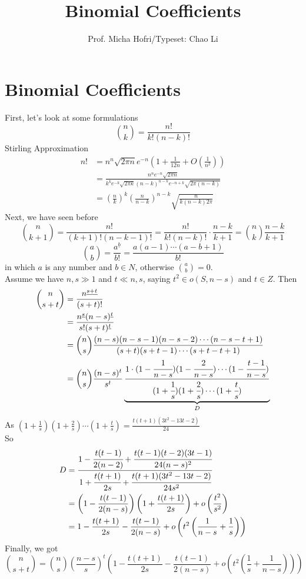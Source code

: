 \documentclass[11pt]{article}
\author{Prof. Micha Hofri/Typeset:  Chao Li}
\title{Binomial Coefficients}
\begin{document}
\maketitle
\section*{Binomial Coefficients}
First, let's look at some formulations \\
\[
\binom{n}{k}=\frac{n!}{k!(n-k)!}
\]
Stirling Approximation \\
\begin{align*}
n!&=n^n\sqrt{2\pi n}e^{-n}\left(1+\frac{1}{12n}+O\left(\frac{1}{n^2}\right)\right) \\
&=\frac{n^ne^{-n}\sqrt{2\pi n}}{k^ke^{-k}\sqrt{2\pi k}(n-k)^{n-k}e^{-n+k}\sqrt{2\pi (n-k)}} \\
&=\left(\frac{n}{k}\right)^k\left(\frac{n}{n-k}\right)^{n-k}\sqrt{\frac{n}{k(n-k)2\pi}}
\end{align*}
Next, we have seen before
\[
\binom{n}{k+1}=\frac{n!}{(k+1)!(n-k-1)!}=\frac{n!}{k!(n-k)!}\cdot \frac{n-k}{k+1}=\binom{n}{k}\frac{n-k}{k+1}
\]
\[
\binom{a}{b}=\frac{a^{\underline{b}}}{b!}=\frac{a(a-1)\cdots (a-b+1)}{b!}
\]
in which \(a\) is any number and \(b\in N\), otherwise \(\binom{a}{b}=0\).\\
Assume we have \(n,s\gg 1\) and \(t\ll n,s\), saying \(t^2\in o(S, n-s)\) and \(t\in Z\).
Then
\begin{align*}
\binom{n}{s+t}&=\frac{n^{\underline{s+t}}}{(s+t)!} \\
			  &=\frac{n^{\underline{s}}(n-s)^{\underline{t}}}{s!(s+t)^{\underline{t}}} \\
			  &=\binom{n}{s}\frac{(n-s)(n-s-1)(n-s-2)\cdots (n-s-t+1)}{(s+t)(s+t-1)\cdots (s+t-t+1)} \\
			  &=\binom{n}{s}\frac{(n-s)^t}{s^t}\underbrace{\frac{1\cdot (1-\cfrac{1}{n-s})(1-\cfrac{2}{n-s})\cdots (1-\cfrac{t-1}{n-s})}{(1+\cfrac{1}{s})(1+\cfrac{2}{s})\cdots (1+\cfrac{t}{s})}}_D
\end{align*}
As \((1+\frac{1}{s})(1+\frac{2}{s})\cdots (1+\frac{t}{s})=\frac{t(t+1)(3t^2-13t-2)}{24}\) \\
So 
\begin{align*}
D&=\cfrac{1-\cfrac{t(t-1)}{2(n-2)}+\cfrac{t(t-1)(t-2)(3t-1)}{24(n-s)^2}}{1+\cfrac{t(t+1)}{2s}+\cfrac{t(t+1)(3t^2-13t-2)}{24s^2}} \\
 &=\left(1-\frac{t(t-1)}{2(n-s)}\right)\left(1+\frac{t(t+1)}{2s}\right)+o\left(\frac{t^2}{s^2}\right) \\
 &=1-\frac{t(t+1)}{2s}-\frac{t(t-1)}{2(n-s)}+o\left(t^2\left(\frac{1}{n-s}+\frac{1}{s}\right)\right)
\end{align*}
Finally, we got
\[
\binom{n}{s+t}=\binom{n}{s}\left(\frac{n-s}{s}\right)^t\left(1-\frac{t(t+1)}{2s}-\frac{t(t-1)}{2(n-s)}+o\left(t^2\left(\frac{1}{s}+\frac{1}{n-s}\right)\right)\right)
\]
\end{document}

